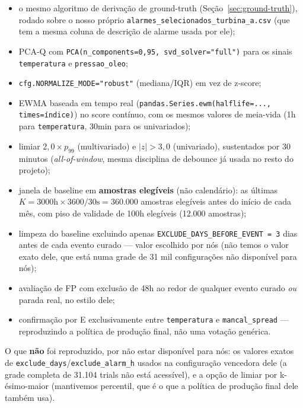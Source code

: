 \documentclass[11pt,a4paper]{article}
\begin{document}
\begin{itemize}[leftmargin=1.4em]
  \item o mesmo algoritmo de derivação de ground-truth
  (Seção~\ref{sec:ground-truth}), rodado sobre o nosso próprio
  \texttt{alarmes\_selecionados\_turbina\_a.csv} (que tem a mesma coluna
  de descrição de alarme usada por ele);
  \item PCA-Q com \texttt{PCA(n\_components=0{,}95, svd\_solver="full")}
  para os sinais \texttt{temperatura} e \texttt{pressao\_oleo};
  \item \texttt{cfg.NORMALIZE\_MODE="robust"} (mediana/IQR) em vez de
  z-score;
  \item EWMA baseada em tempo real (\texttt{pandas.Series.ewm(halflife=...,
  times=índice)}) no score contínuo, com os mesmos valores de meia-vida
  (1h para \texttt{temperatura}, 30min para os univariados);
  \item limiar $2{,}0\times p_{99}$ (multivariado) e $|z|>3{,}0$
  (univariado), sustentados por 30 minutos (\emph{all-of-window}, mesma
  disciplina de debounce já usada no resto do projeto);
  \item janela de baseline em \textbf{amostras elegíveis} (não
  calendário): as últimas $K = 3000\text{h} \times 3600/30\text{s} =
  360.000$ amostras elegíveis antes do início de cada mês, com piso de
  validade de 100h elegíveis (12.000 amostras);
  \item limpeza do baseline excluindo apenas
  \texttt{EXCLUDE\_DAYS\_BEFORE\_EVENT = 3} dias antes de cada evento
  curado --- valor escolhido por nós (não temos o valor exato dele, que
  está numa grade de 31 mil configurações não disponível para nós);
  \item avaliação de FP com exclusão de 48h ao redor de qualquer evento
  curado \emph{ou} parada real, no estilo dele;
  \item confirmação por E exclusivamente entre \texttt{temperatura} e
  \texttt{mancal\_spread} --- reproduzindo a política de produção final,
  não uma votação genérica.
\end{itemize}

O que \textbf{não} foi reproduzido, por não estar disponível para nós:
os valores exatos de \texttt{exclude\_days}/\texttt{exclude\_alarm\_h}
usados na configuração vencedora dele (a grade completa de 31.104 trials
não está acessível), e a opção de limiar por k-ésimo-maior (mantivemos
percentil, que é o que a política de produção final dele também usa).

\end{document}
